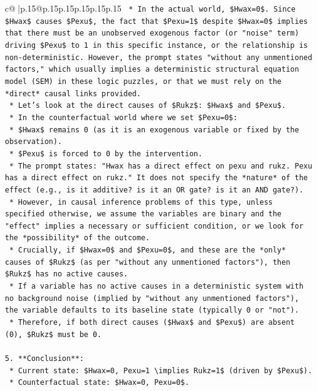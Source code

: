 \documentclass{article}
\begin{document}
{\begin{supertabular}{c@{$\;$}|p{.15\linewidth}@{}p{.15\linewidth}p{.15\linewidth}p{.15\linewidth}p{.15\linewidth}p{.15\linewidth}}
{{{\texttt{    *   In the actual world, \$Hwax=0\$. Since \$Hwax\$ causes \$Pexu\$, the fact that \$Pexu=1\$ despite \$Hwax=0\$ implies that there must be an unobserved exogenous factor (or "noise" term) driving \$Pexu\$ to 1 in this specific instance, or the relationship is non{-}deterministic. However, the prompt states "without any unmentioned factors," which usually implies a deterministic structural equation model (SEM) in these logic puzzles, or that we must rely on the *direct* causal links provided.} \\
\texttt{    *   Let's look at the direct causes of \$Rukz\$: \$Hwax\$ and \$Pexu\$.} \\
\texttt{    *   In the counterfactual world where we set \$Pexu=0\$:} \\
\texttt{        *   \$Hwax\$ remains 0 (as it is an exogenous variable or fixed by the observation).} \\
\texttt{        *   \$Pexu\$ is forced to 0 by the intervention.} \\
\texttt{    *   The prompt states: "Hwax has a direct effect on pexu and rukz. Pexu has a direct effect on rukz." It does not specify the *nature* of the effect (e.g., is it additive? is it an OR gate? is it an AND gate?).} \\
\texttt{    *   However, in causal inference problems of this type, unless specified otherwise, we assume the variables are binary and the "effect" implies a necessary or sufficient condition, or we look for the *possibility* of the outcome.} \\
\texttt{    *   Crucially, if \$Hwax=0\$ and \$Pexu=0\$, and these are the *only* causes of \$Rukz\$ (as per "without any unmentioned factors"), then \$Rukz\$ has no active causes.} \\
\texttt{    *   If a variable has no active causes in a deterministic system with no background noise (implied by "without any unmentioned factors"), the variable defaults to its baseline state (typically 0 or "not").} \\
\texttt{    *   Therefore, if both direct causes (\$Hwax\$ and \$Pexu\$) are absent (0), \$Rukz\$ must be 0.} \\
\\ 
\texttt{5.  **Conclusion**:} \\
\texttt{    *   Current state: \$Hwax=0, Pexu=1 \textbackslash{}implies Rukz=1\$ (driven by \$Pexu\$).} \\
\texttt{    *   Counterfactual state: \$Hwax=0, Pexu=0\$.} \\
}}}
\end{supertabular}}
\end{document}
